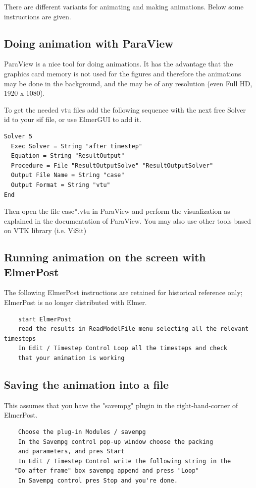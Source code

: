 There are different variants for animating and making animations. Below some instructions are given.

\subsection{Doing animation with ParaView}

ParaView is a nice tool for doing animations. It has the advantage that the graphics card memory is not used for the figures and therefore the animations may be done in the background, and the may be of any resolution (even Full HD, 1920 x 1080).

To get the needed vtu files add the following sequence with the next free Solver id to your sif file, or use ElmerGUI to add it.

\begin{verbatim}
Solver 5 
  Exec Solver = String "after timestep"	
  Equation = String "ResultOutput"
  Procedure = File "ResultOutputSolve" "ResultOutputSolver"
  Output File Name = String "case" 
  Output Format = String "vtu"
End
\end{verbatim}

Then open the file case*.vtu in ParaView and perform the visualization as explained in the documentation of ParaView. You may also use other tools based on VTK library (i.e. ViSit)

\subsection{Running animation on the screen with ElmerPost}

The following ElmerPost instructions are retained for historical reference only;
ElmerPost is no longer distributed with Elmer.

\begin{verbatim}
    start ElmerPost
    read the results in ReadModelFile menu selecting all the relevant timesteps
    In Edit / Timestep Control Loop all the timesteps and check
    that your animation is working 
\end{verbatim}

\subsection{Saving the animation into a file}

This assumes that you have the "savempg" plugin in the right-hand-corner of ElmerPost.

\begin{verbatim}
    Choose the plug-in Modules / savempg
    In the Savempg control pop-up window choose the packing
    and parameters, and pres Start
    In Edit / Timestep Control write the following string in the
   "Do after frame" box savempg append and press "Loop"
    In Savempg control pres Stop and you're done. 
\end{verbatim}


